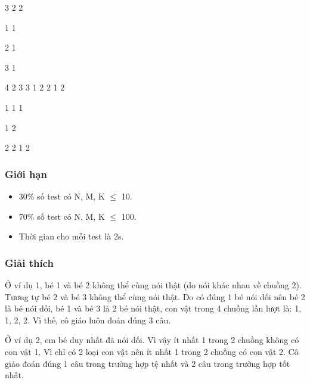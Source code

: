            3 2 2          

           1 1          

           2 1          

           3 1          

           4 2                    3 3                   1 2 2 1 2         

           1 1 1          

           1 2          

           2 2                    1 2         
\\

\subsubsection{     Giới hạn    }
\begin{itemize}
	\item        30\% số test có    N, M, K  $\le$  10.      
	\item        70\% số test có    N, M, K  $\le$  100.      
	\item        Thời gian cho    mỗi test là 2s.      
\end{itemize}

\subsubsection{     Giải thích    }

      Ở ví dụ 1, bé 1 và bé  2 không thể cùng nói thật (do nói khác nhau về chuồng 2).  Tương tự bé 2 và bé 3 không thể cùng nói thật. Do có  đúng 1 bé nói dối nên bé 2 là bé nói dối, bé 1 và bé  3 là 2 bé nói thật, con vật trong 4 chuồng lần lượt là:  1, 1, 2, 2. Vì thế, cô giáo luôn đoán đúng 3 câu.     

      Ở ví dụ 2, em bé duy  nhất đã nói dối. Vì vậy ít nhất 1 trong 2 chuồng không  có con vật 1. Vì chỉ có 2 loại con vật nên ít nhất 1  trong 2 chuồng có con vật 2. Cô giáo đoán đúng 1 câu trong  trường hợp tệ nhất và 2 câu trong trường hợp tốt nhất.     

